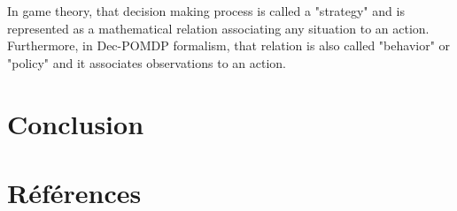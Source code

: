 \documentclass[conference]{IEEEtran}
\begin{document}
In game theory, that decision making process is called a "strategy" and is represented as a mathematical relation associating any situation to an action.
Furthermore, in Dec-POMDP formalism, that relation is also called "behavior" or "policy" and it associates observations to an action.

\section{Conclusion}


\section*{Références}

% 



\end{document}
